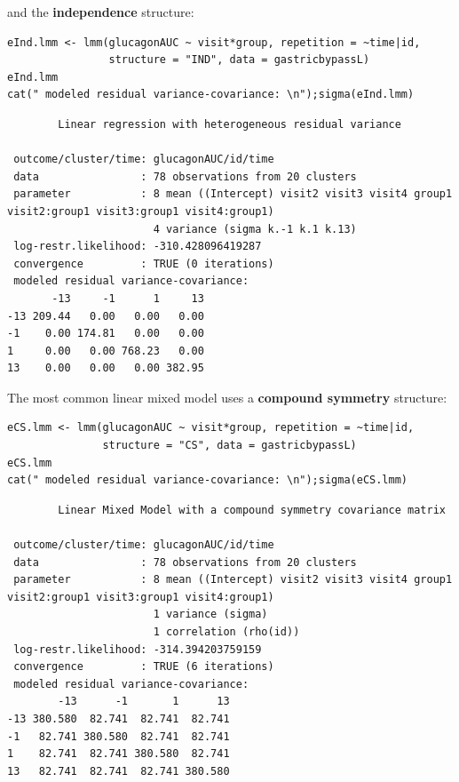 \documentclass[12pt]{article}
\begin{document}
and the \textbf{independence} structure:
\lstset{language=r,label= ,caption= ,captionpos=b,numbers=none}
\begin{lstlisting}
eInd.lmm <- lmm(glucagonAUC ~ visit*group, repetition = ~time|id, 
                structure = "IND", data = gastricbypassL)
eInd.lmm
cat(" modeled residual variance-covariance: \n");sigma(eInd.lmm)
\end{lstlisting}

\begin{verbatim}
		Linear regression with heterogeneous residual variance 

 outcome/cluster/time: glucagonAUC/id/time 
 data                : 78 observations from 20 clusters 
 parameter           : 8 mean ((Intercept) visit2 visit3 visit4 group1 visit2:group1 visit3:group1 visit4:group1) 
                       4 variance (sigma k.-1 k.1 k.13) 
 log-restr.likelihood: -310.428096419287 
 convergence         : TRUE (0 iterations)
 modeled residual variance-covariance: 
       -13     -1      1     13
-13 209.44   0.00   0.00   0.00
-1    0.00 174.81   0.00   0.00
1     0.00   0.00 768.23   0.00
13    0.00   0.00   0.00 382.95
\end{verbatim}

\clearpage

The most common linear mixed model uses a \textbf{compound symmetry} structure:
\lstset{language=r,label= ,caption= ,captionpos=b,numbers=none}
\begin{lstlisting}
eCS.lmm <- lmm(glucagonAUC ~ visit*group, repetition = ~time|id,
               structure = "CS", data = gastricbypassL)
eCS.lmm
cat(" modeled residual variance-covariance: \n");sigma(eCS.lmm)
\end{lstlisting}

\begin{verbatim}
		Linear Mixed Model with a compound symmetry covariance matrix 

 outcome/cluster/time: glucagonAUC/id/time 
 data                : 78 observations from 20 clusters 
 parameter           : 8 mean ((Intercept) visit2 visit3 visit4 group1 visit2:group1 visit3:group1 visit4:group1) 
                       1 variance (sigma) 
                       1 correlation (rho(id)) 
 log-restr.likelihood: -314.394203759159 
 convergence         : TRUE (6 iterations)
 modeled residual variance-covariance: 
        -13      -1       1      13
-13 380.580  82.741  82.741  82.741
-1   82.741 380.580  82.741  82.741
1    82.741  82.741 380.580  82.741
13   82.741  82.741  82.741 380.580
\end{verbatim}
\end{document}
